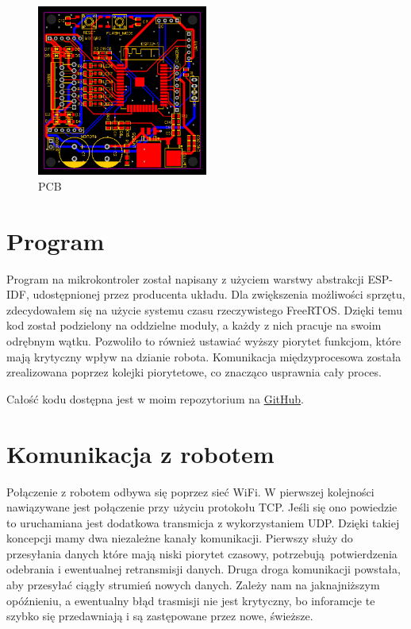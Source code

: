 \documentclass[10pt, a4paper]{article}
\begin{document}
\begin{figure}[H]
	\centering
	\includegraphics[width=0.5\textwidth]{figures/pcb.png}
	\caption{PCB}
	\label{fig:pcb}
\end{figure}


\section{Program}
Program na mikrokontroler został napisany z użyciem warstwy abstrakcji
ESP-IDF, udostępnionej przez producenta układu. Dla zwiększenia 
możliwości sprzętu, zdecydowałem się na użycie systemu czasu rzeczywistego
FreeRTOS. Dzięki temu kod został podzielony na oddzielne moduły, 
a każdy z nich pracuje na swoim odrębnym wątku. Pozwoliło to również
ustawiać wyższy piorytet funkcjom, które mają krytyczny wpływ na dzianie robota.
Komunikacja międzyprocesowa została zrealizowana poprzez kolejki piorytetowe,
co znacząco usprawnia cały proces.

Całość kodu dostępna jest w moim repozytorium na
\href{https://github.com/mbober1/ReTank}{GitHub}.

\section{Komunikacja z robotem}

Połączenie z robotem odbywa się poprzez sieć WiFi. W pierwszej kolejności 
nawiązywane jest połączenie przy użyciu protokołu TCP. Jeśli się ono powiedzie
to uruchamiana jest dodatkowa transmicja z wykorzystaniem UDP. 
Dzięki takiej koncepcji mamy dwa niezależne kanały komunikacji. Pierwszy służy
do przesyłania danych które mają niski piorytet czasowy, potrzebują potwierdzenia
odebrania i ewentualnej retransmisji danych. Druga droga komunikacji powstała, 
aby przesyłać ciągły strumień nowych danych. Zależy nam na jaknajniższym opóźnieniu,
a ewentualny błąd trasmisji nie jest krytyczny, bo inforamcje te szybko się 
przedawniają i są zastępowane przez nowe, świeższe. \newline
\end{document}
